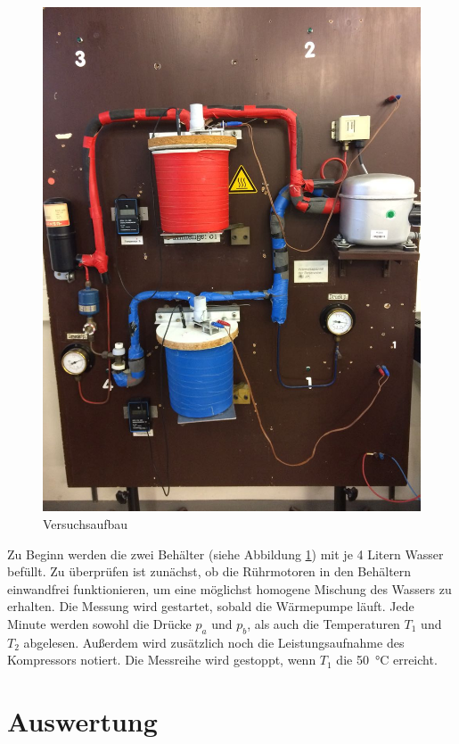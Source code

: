 \begin{figure}
\centering
  \includegraphics[scale = 0.2]{Aufbau.jpeg}
  \caption{Versuchsaufbau}
  \label{Abb:2}
\end{figure}
Zu Beginn werden die zwei Behälter (siehe Abbildung \ref{Abb:2}) mit je 4 Litern Wasser befüllt. Zu überprüfen ist zunächst, ob die Rührmotoren
in den Behältern einwandfrei funktionieren, um eine möglichst homogene Mischung des Wassers zu erhalten.
Die Messung wird gestartet, sobald die Wärmepumpe läuft. Jede Minute werden sowohl die Drücke $p_a$ und $p_b$, als auch die Temperaturen $T_1$ und
$T_2$ abgelesen. Außerdem wird zusätzlich noch die Leistungsaufnahme des Kompressors notiert. Die Messreihe wird gestoppt, wenn
$T_1$ die \SI{50}{\celsius} erreicht.

\section{Auswertung}
